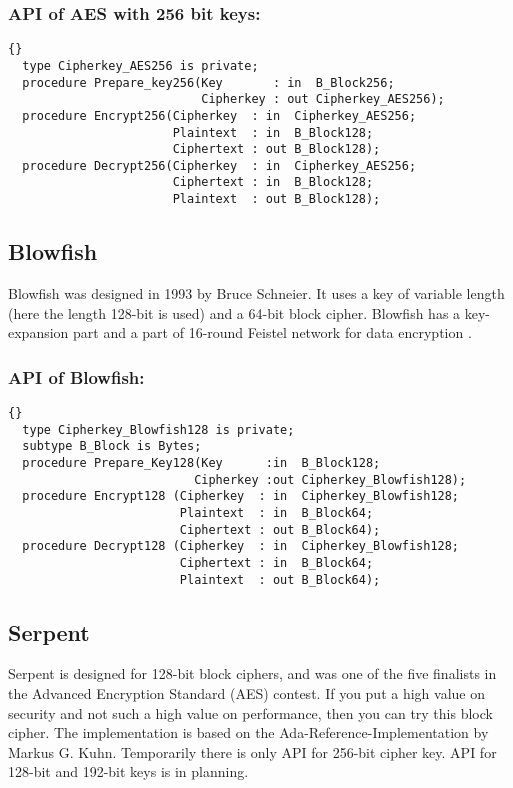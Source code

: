 \subsubsection*{API of AES with 256 bit keys:}
\begin{lstlisting}{}
  type Cipherkey_AES256 is private;
  procedure Prepare_key256(Key       : in  B_Block256;
                           Cipherkey : out Cipherkey_AES256);
  procedure Encrypt256(Cipherkey  : in  Cipherkey_AES256;
                       Plaintext  : in  B_Block128;
                       Ciphertext : out B_Block128);
  procedure Decrypt256(Cipherkey  : in  Cipherkey_AES256;
                       Ciphertext : in  B_Block128;
                       Plaintext  : out B_Block128);
\end{lstlisting}


\subsection{Blowfish}
Blowfish was designed in 1993 by Bruce Schneier. It uses a key of
variable length (here the length 128-bit is used) and a 64-bit block
cipher. Blowfish has a key-expansion part and a part of 16-round
Feistel network for data encryption \cite{DBLP:conf/fse/Schneier93}.
\subsubsection*{API of Blowfish:}
\begin{lstlisting}{}
  type Cipherkey_Blowfish128 is private;
  subtype B_Block is Bytes;
  procedure Prepare_Key128(Key      :in  B_Block128;
                          Cipherkey :out Cipherkey_Blowfish128);
  procedure Encrypt128 (Cipherkey  : in  Cipherkey_Blowfish128;
                        Plaintext  : in  B_Block64;
                        Ciphertext : out B_Block64);
  procedure Decrypt128 (Cipherkey  : in  Cipherkey_Blowfish128;
                        Ciphertext : in  B_Block64;
                        Plaintext  : out B_Block64);
\end{lstlisting}


\subsection{Serpent}
Serpent is designed for 128-bit block ciphers, and was one of the five
finalists in the Advanced Encryption Standard (AES) contest. If you
put a high value on security and not such a high value on performance,
then you can try this block cipher. The implementation is based on the
Ada-Reference-Implementation by Markus G. Kuhn. Temporarily there is
only API for 256-bit cipher key. API for 128-bit and 192-bit keys is
in planning.
